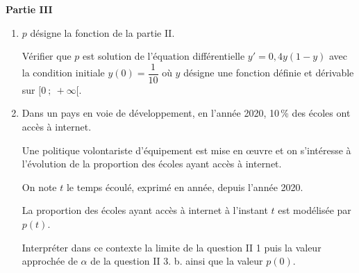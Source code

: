 \documentclass[10pt]{article}
\begin{document}
\bigskip

\textbf{Partie III}

\medskip

\begin{enumerate}
\item $p$ désigne la fonction de la partie II.

Vérifier que $p$ est solution de l'équation différentielle $y' = 0,4y(1 - y)$ avec la condition initiale 
$y(0) = \dfrac{1}{10}$ où $y$ désigne une fonction définie et dérivable sur $[0~;~ + \infty[$.
\item Dans un pays en voie de développement, en l'année 2020, 10\,\% des écoles ont accès à internet. 

Une politique volontariste d'équipement est mise en œuvre et on s'intéresse à l'évolution de la proportion des écoles ayant accès à internet. 

On note $t$ le temps écoulé, exprimé en année, depuis l'année 2020.

La proportion des écoles ayant accès à internet à l'instant $t$ est modélisée par $p(t)$.

Interpréter dans ce contexte la limite de la question II 1 puis la valeur approchée de $\alpha$ de la question II 3. b. ainsi que la valeur $p(0)$.
\end{enumerate}
\end{document}
